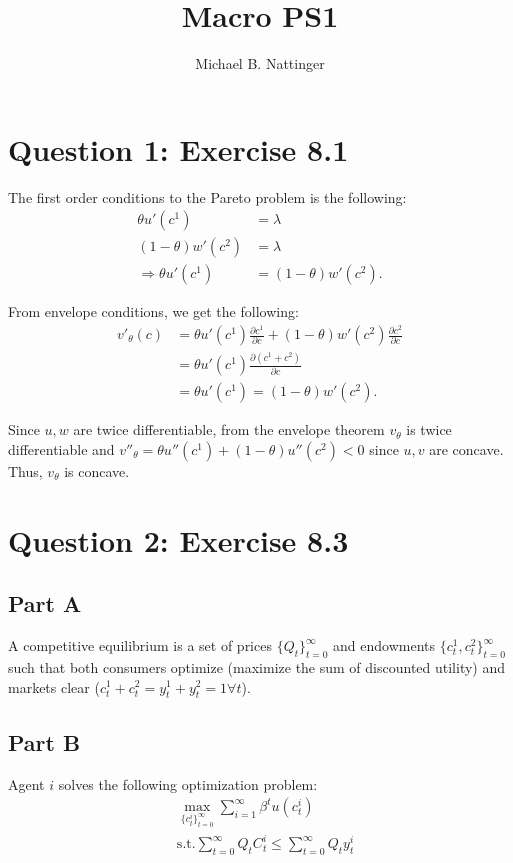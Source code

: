 \documentclass[11pt]{article} %
\title{Macro PS1}
\author{Michael B. Nattinger}
\begin{document}
\maketitle
\section{Question 1: Exercise 8.1}
The first order conditions to the Pareto problem is the following:
\begin{align*}
\theta u'(c^1) &= \lambda\\
(1-\theta)w'(c^2) &= \lambda\\
\Rightarrow \theta u'(c^1) &= (1-\theta)w'(c^2) .
\end{align*}

From envelope conditions, we get the following:
\begin{align*}
v'_{\theta}(c) &= \theta u'(c^1) \frac{\partial  c^1}{\partial c} + (1-\theta)w'(c^2)  \frac{\partial  c^2}{\partial c} \\
&= \theta u'(c^1) \frac{\partial  (c^1+c^2)}{\partial c}\\
&= \theta u'(c^1) = (1-\theta)w'(c^2) .
\end{align*}

Since $u,w$ are twice differentiable, from the envelope theorem $v_{\theta}$ is twice differentiable and $v''_{\theta} = \theta u''(c^1) + (1-\theta) u''(c^2)<0$ since $u,v$ are concave. Thus, $v_{\theta}$ is concave.

%
%
\section{Question 2: Exercise 8.3}
\subsection{Part A}
A competitive equilibrium is a set of prices $\{Q_t\}_{t=0}^{\infty}$ and endowments $\{ c_t^1,c_t^2 \}_{t=0}^{\infty}$ such that both consumers optimize (maximize the sum of discounted utility) and markets clear ($c^1_t + c^2_t = y_t^1 + y_t^2 = 1 \forall t$).
\subsection{Part B}
Agent $i$ solves the following optimization problem:
\begin{align*}
&\max_{\{ c_{t}^i\}_{t=0}^{\infty}} \sum_{i=1}^{\infty}\beta^t u(c_{t}^i)\\
&\text{s.t.} \sum_{t=0}^{\infty}Q_tC_{t}^i \leq \sum_{t=0}^{\infty} Q_t y_{t}^i
\end{align*}
\end{document}

